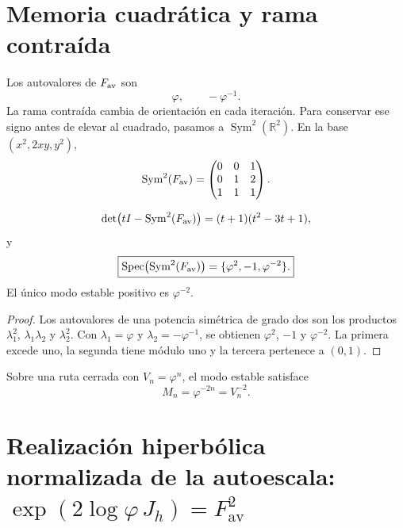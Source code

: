 \section{Memoria cuadrática y rama contraída}

Los autovalores de \(F_{\rm av}\) son
\[
 \varphi,
 \qquad
 -\varphi^{-1}.
\]
La rama contraída cambia de orientación en cada iteración. Para conservar
ese signo antes de elevar al cuadrado, pasamos a
\(\operatorname{Sym}^2(\mathbb R^2)\). En la base
\((x^2,2xy,y^2)\),
\begin{equation}
 \operatorname{Sym}^2(F_{\rm av})=
 \begin{pmatrix}
 0&0&1\\
 0&1&2\\
 1&1&1
 \end{pmatrix}.
 \label{gfp:b:eq:sym2-Fav-phi}
\end{equation}

\begin{theorem}
\label{gfp:b:thm:espectro-sym2-phi}
\[
 \det\bigl(tI-\operatorname{Sym}^2(F_{\rm av})\bigr)
 =(t+1)(t^2-3t+1),
\]
y
\begin{equation}
 \boxed{
 \operatorname{Spec}\bigl(\operatorname{Sym}^2(F_{\rm av})\bigr)
 =\{\varphi^2,-1,\varphi^{-2}\}.}
 \label{gfp:b:eq:espectro-sym2-phi}
\end{equation}
El único modo estable positivo es \(\varphi^{-2}\).
\end{theorem}

\begin{proof}
Los autovalores de una potencia simétrica de grado dos son los productos
\(\lambda_1^2\), \(\lambda_1\lambda_2\) y \(\lambda_2^2\). Con
\(\lambda_1=\varphi\) y \(\lambda_2=-\varphi^{-1}\), se obtienen
\(\varphi^2\), \(-1\) y \(\varphi^{-2}\). La primera excede uno, la
segunda tiene módulo uno y la tercera pertenece a \((0,1)\).
\end{proof}

Sobre una ruta cerrada con \(V_n=\varphi^n\), el modo estable satisface
\begin{equation}
 \boxed{M_n=\varphi^{-2n}=V_n^{-2}.}
 \label{gfp:b:eq:modo-estable-phi}
\end{equation}

\section{Realización hiperbólica normalizada de la autoescala: \(\exp(2\log\varphi\,J_h)=F_{\mathrm{av}}^2\)}

